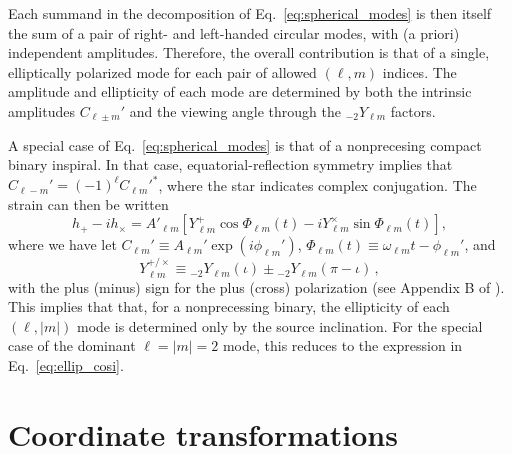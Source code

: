 \documentclass[aps,prd,twocolumn,superscriptaddress,preprintnumbers,floatfix,nofootinbib]{revtex4-2}
\begin{document}
Each summand in the decomposition of Eq.~\eqref{eq:spherical_modes} is then itself the sum of a pair of right- and left-handed circular modes, with (a priori) independent amplitudes.
Therefore, the overall contribution is that of a single, elliptically polarized mode for each pair of allowed $(\ell, m)$ indices.
The amplitude and ellipticity of each mode are determined by both the intrinsic amplitudes $C_{\ell \pm m}'$ and the viewing angle through the ${}_{-2} Y_{\ell m}$ factors.

A special case of Eq.~\eqref{eq:spherical_modes} is that of a nonprecesing compact binary inspiral.
In that case, equatorial-reflection symmetry implies that $C_{\ell -m}' = (-1)^\ell C_{\ell m}'^*$, where the star indicates complex conjugation.
The strain can then be written
\begin{equation}
h_+ - i h_\times = A'_{\ell m} \left[ Y^+_{\ell m} \cos \Phi_{\ell m}(t) - 
i Y^\times_{\ell m} \sin \Phi_{\ell m}(t) \right] , 
\end{equation}
where we have let $C_{\ell m}' \equiv A_{\ell m}' \exp(i \phi_{\ell m}')$, $\Phi_{\ell m}(t) \equiv \omega_{\ell m} t - \phi_{\ell m}'$, and
\begin{equation}
Y_{\ell m}^{+/\times} \equiv {}_{-2} Y_{\ell m}(\iota) \pm {}_{-2} Y_{\ell m}(\pi-\iota) \, ,
\end{equation}
with the plus (minus) sign for the plus (cross) polarization (see Appendix B of \cite{Isi:2021iql}).
This implies that that, for a nonprecessing binary, the ellipticity of each $(\ell, |m|)$ mode is determined only by the source inclination.
For the special case of the dominant $\ell=|m|=2$ mode, this reduces to the expression in Eq.~\eqref{eq:ellip_cosi}.



\section{Coordinate transformations}
\end{document}
